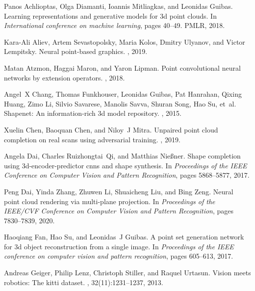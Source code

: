\documentclass[final]{cvpr}
\begin{document}
{\small
 \begin{thebibliography}{10}\itemsep=-1pt

Panos Achlioptas, Olga Diamanti, Ioannis Mitliagkas, and Leonidas Guibas.
\newblock Learning representations and generative models for 3d point clouds.
\newblock In {\em International conference on machine learning}, pages 40--49.
  PMLR, 2018.

Kara-Ali Aliev, Artem Sevastopolsky, Maria Kolos, Dmitry Ulyanov, and Victor
  Lempitsky.
\newblock Neural point-based graphics.
, 2019.

Matan Atzmon, Haggai Maron, and Yaron Lipman.
\newblock Point convolutional neural networks by extension operators.
, 2018.

Angel~X Chang, Thomas Funkhouser, Leonidas Guibas, Pat Hanrahan, Qixing Huang,
  Zimo Li, Silvio Savarese, Manolis Savva, Shuran Song, Hao Su, et~al.
\newblock Shapenet: An information-rich 3d model repository.
, 2015.

Xuelin Chen, Baoquan Chen, and Niloy~J Mitra.
\newblock Unpaired point cloud completion on real scans using adversarial
  training.
, 2019.

Angela Dai, Charles Ruizhongtai~Qi, and Matthias Nie{\ss}ner.
\newblock Shape completion using 3d-encoder-predictor cnns and shape synthesis.
\newblock In {\em Proceedings of the IEEE Conference on Computer Vision and
  Pattern Recognition}, pages 5868--5877, 2017.

Peng Dai, Yinda Zhang, Zhuwen Li, Shuaicheng Liu, and Bing Zeng.
\newblock Neural point cloud rendering via multi-plane projection.
\newblock In {\em Proceedings of the IEEE/CVF Conference on Computer Vision and
  Pattern Recognition}, pages 7830--7839, 2020.

Haoqiang Fan, Hao Su, and Leonidas~J Guibas.
\newblock A point set generation network for 3d object reconstruction from a
  single image.
\newblock In {\em Proceedings of the IEEE conference on computer vision and
  pattern recognition}, pages 605--613, 2017.

Andreas Geiger, Philip Lenz, Christoph Stiller, and Raquel Urtasun.
\newblock Vision meets robotics: The kitti dataset.
,
  32(11):1231--1237, 2013.


\end{thebibliography}}
\end{document}
